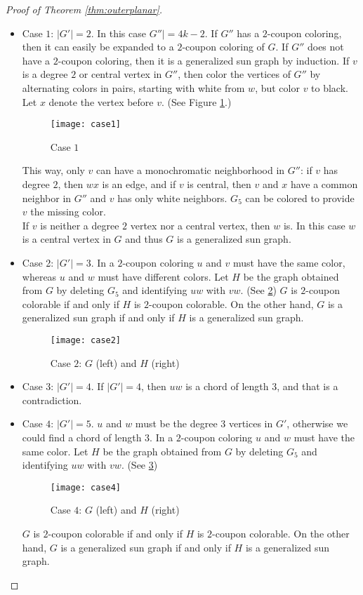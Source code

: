 \begin{proof}[Proof of Theorem \ref{thm:outerplanar}]
  \begin{itemize}
    \item Case $1$: $|G'| = 2$.
      In this case $G''| = 4k - 2$. If $G''$ has a $2$-coupon coloring, then
      it can easily be expanded to a $2$-coupon coloring of $G$. If $G''$ does
      not have a $2$-coupon coloring, then it is a generalized sun graph by induction.
      If $v$ is a degree $2$ or central vertex in $G''$, then color the vertices of $G''$ by
      alternating colors in pairs, starting with white from $w$, but color $v$ to
      black. Let $x$ denote the vertex before $v$. (See Figure \ref{fig:case1}.)
      \begin{figure}[ht]
        \centering
        \texttt{[image: case1]}
        \caption{Case $1$}
        \label{fig:case1}
      \end{figure}
      This way, only $v$ can have a monochromatic neighborhood in $G''$: if $v$ has degree
      $2$, then $wx$ is an edge, and if $v$ is central, then $v$ and $x$ have a common
      neighbor in $G''$ and $v$ has only white neighbors. $G_5$ can be colored to
      provide $v$ the missing color. \\

      If $v$ is neither a degree $2$ vertex nor a central vertex, then $w$ is. In
      this case $w$ is a central vertex in $G$ and thus $G$ is a generalized sun graph.
    \item Case 2: $|G'| = 3$.
      In a $2$-coupon coloring $u$ and $v$ must have the same color, whereas $u$
      and $w$ must have different colors. Let $H$ be the graph obtained from $G$
      by deleting $G_5$ and identifying $uw$ with $vw$. (See \ref{fig:case2})
      $G$ is $2$-coupon colorable if and only if $H$ is $2$-coupon colorable. On the other hand,
      $G$ is a generalized sun graph if and only if $H$ is a generalized sun graph.
      \begin{figure}[ht]
        \centering
        \texttt{[image: case2]}
        \caption{Case $2$: $G$ (left) and $H$ (right)}
        \label{fig:case2}
      \end{figure}
    \item Case $3$: $|G'| = 4$.
      If $|G'| = 4$, then $uw$ is a chord of length $3$, and that is a contradiction.
    \item Case $4$: $|G'| = 5$.
      $u$ and $w$ must be the degree $3$ vertices in $G'$, otherwise we could
      find a chord of length $3$. In a $2$-coupon coloring $u$ and $w$ must have
      the same color. Let $H$ be the graph obtained from $G$ by deleting $G_5$
      and identifying $uw$ with $vw$. (See \ref{fig:case4})
      \begin{figure}[ht]
        \centering
        \texttt{[image: case4]}
        \caption{Case $4$: $G$ (left) and $H$ (right)}
        \label{fig:case4}
      \end{figure}
      $G$ is $2$-coupon colorable if and only if $H$ is $2$-coupon colorable. On the other hand,
      $G$ is a generalized sun graph if and only if $H$ is a generalized sun graph.
  \end{itemize}
\end{proof}

